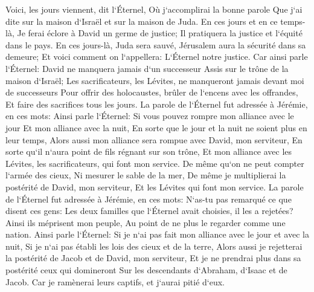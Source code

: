 \verse Voici, les jours viennent, dit l`Éternel, Où j`accomplirai la bonne parole Que j`ai dite sur la maison d`Israël et sur la maison de Juda. 
\verse En ces jours et en ce temps-là, Je ferai éclore à David un germe de justice; Il pratiquera la justice et l`équité dans le pays. 
\verse En ces jours-là, Juda sera sauvé, Jérusalem aura la sécurité dans sa demeure; Et voici comment on l`appellera: L`Éternel notre justice. 
\verse Car ainsi parle l`Éternel: David ne manquera jamais d`un successeur Assis sur le trône de la maison d`Israël; 
\verse Les sacrificateurs, les Lévites, ne manqueront jamais devant moi de successeurs Pour offrir des holocaustes, brûler de l`encens avec les offrandes, Et faire des sacrifices tous les jours. 
\verse La parole de l`Éternel fut adressée à Jérémie, en ces mots: 
\verse Ainsi parle l`Éternel: Si vous pouvez rompre mon alliance avec le jour Et mon alliance avec la nuit, En sorte que le jour et la nuit ne soient plus en leur temps, 
\verse Alors aussi mon alliance sera rompue avec David, mon serviteur, En sorte qu`il n`aura point de fils régnant sur son trône, Et mon alliance avec les Lévites, les sacrificateurs, qui font mon service. 
\verse De même qu`on ne peut compter l`armée des cieux, Ni mesurer le sable de la mer, De même je multiplierai la postérité de David, mon serviteur, Et les Lévites qui font mon service. 
\verse La parole de l`Éternel fut adressée à Jérémie, en ces mots: 
\verse N`as-tu pas remarqué ce que disent ces gens: Les deux familles que l`Éternel avait choisies, il les a rejetées? Ainsi ils méprisent mon peuple, Au point de ne plus le regarder comme une nation. 
\verse Ainsi parle l`Éternel: Si je n`ai pas fait mon alliance avec le jour et avec la nuit, Si je n`ai pas établi les lois des cieux et de la terre, 
\verse Alors aussi je rejetterai la postérité de Jacob et de David, mon serviteur, Et je ne prendrai plus dans sa postérité ceux qui domineront Sur les descendants d`Abraham, d`Isaac et de Jacob. Car je ramènerai leurs captifs, et j`aurai pitié d`eux. 

